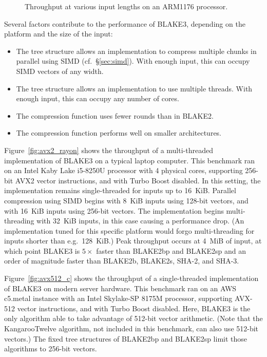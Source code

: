 \documentclass[12pt,notitlepage,a4paper]{article}
\begin{document}
\begin{figure}[h]
\centering
%

\caption{Throughput at various input lengths on an ARM1176 processor.}%
\label{fig:rpizero}
\end{figure}

Several factors contribute to the performance of BLAKE3, depending on the
platform and the size of the input:

\begin{itemize}
    \item The tree structure allows an implementation to compress multiple
        chunks in parallel using SIMD (cf.~\S\ref{sec:simd}). With enough
        input, this can occupy SIMD vectors of any width.
    \item The tree structure allows an implementation to use multiple threads.
        With enough input, this can occupy any number of cores.
    \item The compression function uses fewer rounds than in BLAKE2.
    \item The compression function performs well on smaller architectures.
\end{itemize}

Figure~\ref{fig:avx2_rayon} shows the throughput of a multi-threaded
implementation of BLAKE3 on a typical laptop computer. This benchmark ran on an
Intel Kaby Lake i5-8250U processor with 4 physical cores, supporting 256-bit
AVX2 vector instructions, and with Turbo Boost disabled. In this setting, the
implementation remains single-threaded for inputs up to 16~KiB. Parallel
compression using SIMD begins with 8~KiB inputs using 128-bit vectors, and with
16~KiB inputs using 256-bit vectors. The implementation begins multi-threading
with 32~KiB inputs, in this case causing a performance drop. (An implementation
tuned for this specific platform would forgo multi-threading for inputs shorter
than e.g.\ 128~KiB.) Peak throughput occurs at 4~MiB of input, at which point
BLAKE3 is $5\times$ faster than BLAKE2bp and BLAKE2sp and an order of magnitude
faster than BLAKE2b, BLAKE2s, SHA-2, and SHA-3.

Figure~\ref{fig:avx512_c} shows the throughput of a single-threaded
implementation of BLAKE3 on modern server hardware. This benchmark ran on an
AWS c5.metal instance with an Intel Skylake-SP 8175M processor, supporting
AVX-512 vector instructions, and with Turbo Boost disabled. Here, BLAKE3 is the
only algorithm able to take advantage of 512-bit vector arithmetic. (Note that
the KangarooTwelve algorithm, not included in this benchmark, can also use
512-bit vectors.) The fixed tree structures of BLAKE2bp and BLAKE2sp limit
those algorithms to 256-bit vectors.
\end{document}
